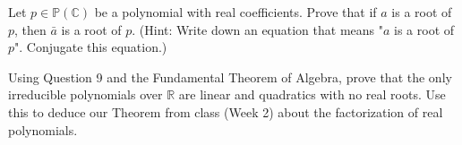 \documentclass{article}
\theoremstyle{plain} %
\numberwithin{thm}{section} %
\theoremstyle{definition}
\begin{document}
    \newpage
    \begin{question}{9}
        Let $p \in \mathbb{P}(\mathbb{C})$ be a polynomial with real coefficients. Prove that if $a$ is a root of $p$, then $\bar{a}$ is a root of $p$. (Hint: Write down an equation that means "$a$ is a root of $p$". Conjugate this equation.)
    \end{question}
    \newpage
    \begin{question}{10}
        Using Question 9 and the Fundamental Theorem of Algebra, prove that the only irreducible 
        polynomials over $\mathbb{R}$ are linear and quadratics with no real roots. Use this to deduce our Theorem from class (Week 2) about the factorization of real polynomials.
    \end{question}
\end{document}
